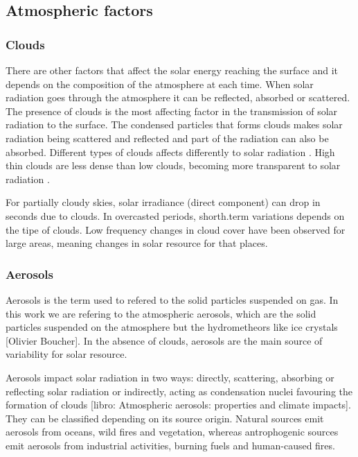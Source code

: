 \subsection{Atmospheric factors}

\subsubsection{Clouds}

There are other factors that affect the solar energy reaching the surface and it depends on the composition of the atmosphere at each time. When solar radiation goes through the atmosphere it can be reflected, absorbed or scattered. The presence of clouds is the most affecting factor in the transmission of solar radiation to the surface. The condensed particles that forms clouds makes solar radiation being scattered and reflected and part of the radiation can also be absorbed. Different types of clouds affects differently to solar radiation \cite*{Page2012}. High thin clouds are less dense than low clouds, becoming more transparent to solar radiation \cite*{Kasten1980}. %

For partially cloudy skies, solar irradiance (direct component) can drop in seconds \cite*{Page2012} due to clouds. In overcasted periods, shorth.term variations depends on the tipe of clouds. Low frequency changes in cloud cover have been observed for large areas, meaning changes in solar resource for that places.

\subsubsection{Aerosols}

Aerosols is the term used to refered to the solid particles suspended on gas. In this work we are refering to the atmospheric aerosols, which are the solid particles suspended on the atmosphere but the hydrometheors like ice crystals [Olivier Boucher]. In the absence of clouds, aerosols are the main source of variability for solar resource. 

Aerosols impact solar radiation in two ways: directly, scattering, absorbing or reflecting solar radiation or indirectly, acting as condensation nuclei favouring the formation of clouds [libro: Atmospheric aerosols: properties and climate impacts]. They can be classified depending on its source origin. Natural sources emit aerosols from oceans, wild fires and vegetation, whereas antrophogenic sources emit aerosols from industrial activities, burning fuels and human-caused fires.

